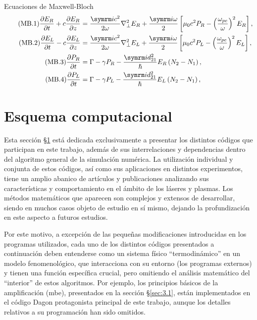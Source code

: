 \begin{footheorem*}{Ecuaciones de Maxwell-Bloch}
  \begin{align}
    \tag{MB.1}
    \pdv{E_{R}}{t} + c \pdv{E_{R}}{z} &= \frac{\iu c^{2}}{2 \omega}\laplacian_{\perp}E_{R} + \frac{\iu \omega}{2} \left[\mu_{0}c^{2}P_{R} - \left(\frac{\omega_{pe}}{\omega}\right)^{2}E_{R}\right], \\
    \tag{MB.2}
    \pdv{E_{L}}{t} - c \pdv{E_{L}}{z} &= \frac{\iu c^{2}}{2 \omega}\laplacian_{\perp}E_{L} + \frac{\iu \omega}{2} \left[\mu_{0}c^{2}P_{L} - \left(\frac{\omega_{pe}}{\omega}\right)^{2}E_{L}\right], \\
    \tag{MB.3}
    \pdv{P_{R}}{t} &= \Gamma - \gamma P_{R} - \frac{\iu d^{2}_{21}}{\hslash }E_{R}\left(N_{2}-N_{1}\right), \\
    \tag{MB.4}
    \pdv{P_{L}}{t} &= \Gamma - \gamma P_{L} - \frac{\iu d^{2}_{21}}{\hslash }E_{L}\left(N_{2}-N_{1}\right),
  \end{align}
\end{footheorem*}

\section{Esquema computacional}\label{sec:3.2}
Esta sección \S\ref{sec:3.2} está dedicada exclusivamente a presentar los distintos códigos que participan en este trabajo, además de sus interrelaciones y dependencias dentro del algoritmo general de la simulación numérica. La utilización individual y conjunta de estos códigos, así como sus aplicaciones en distintos experimentos, tiene un amplio abanico de artículos y publicaciones\autocite{Larroche2000,Almiev2007,Velarde2005,Oliva2009} analizando sus características y comportamiento en el ámbito de los láseres y plasmas. Los métodos matemáticos que aparecen son complejos y extensos de desarrollar, siendo en muchos casos objeto de estudio en sí mismo\autocite{Oliva2010a}, dejando la profundización en este aspecto a futuros estudios.

Por este motivo, a excepción de las pequeñas modificaciones introducidas en los programas utilizados, cada uno de los distintos códigos presentados a continuación deben entenderse como un sistema físico \enquote{termodinámico} en un modelo fenomenológico, que interacciona con su entorno (los programas externos) y tienen una función específica crucial, pero omitiendo el análisis matemático del \enquote{interior} de estos algoritmos. Por ejemplo, los principios básicos de la amplificación (\acrshort{mbe}), presentados en la sección \S\ref{sec:3.1}, están implementados en el código Dagon protagonista principal de este trabajo, aunque los detalles relativos a su programación han sido omitidos.

